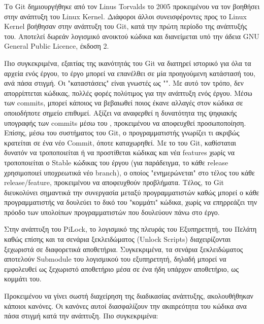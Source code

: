 		Το Git δημιουργήθηκε από τον Linus Torvalds το 2005 προκειμένου να τον βοηθήσει στην ανάπτυξη του Linux Kernel\textsuperscript{\cite{Git_History}}. Διάφοροι άλλοι συνεισφέροντες προς το Linux Kernel βοήθησαν στην ανάπτυξη του Git, κατά την πρώτη περίοδο της ανάπτυξής του. Αποτελεί δωρεάν λογισμικό ανοικτού κώδικα και διανείμεται υπό την άδεια GNU General Public Licence, έκδοση 2\textsuperscript{\cite{Git_Licence}}. 

		Πιο συγκεκριμένα, εξαιτίας της ικανότητάς του Git να διατηρεί ιστορικό για όλα τα αρχεία ενός έργου, το έργο μπορεί να επανέλθει σε μία προηγούμενη κατάστασή του, ανά πάσα στιγμή. Οι "καταστάσεις" είναι γνωστές ως "". Με αυτό τον τρόπο, δεν απορρίπτεται κώδικας, πολλές φορές πολύτιμος για την ανάπτυξη ενός έργου. Μέσω των commits, μπορεί κάποιος να βεβαιωθεί ποιος έκανε αλλαγές στον κώδικα σε οποιοδήποτε σημείο επιθυμεί. Αξίζει να αναφερθεί η δυνατότητα της ψηφιακής υπογραφής των commits μέσω του , προκειμένου να αποφευχθεί προσωποποίηση\textsuperscript{\cite{Git_commit_assurance}}. Επίσης, μέσω του συστήματος  του Git, ο προγραμματιστής γνωρίζει τι ακριβώς κρατείται σε ένα νέο Commit, όποτε καταχωρηθεί. Με το  του Git, καθίσταται δυνατόν να τροποποιείται ή να προστίθεται κώδικας και νέα features χωρίς να τροποποιείται ο Stable κώδικας του έργου (για παράδειγμα, το κάθε release χρησιμοποιεί υποχρεωτικά νέο branch), ο οποίος "ενημερώνεται" στο τέλος του κάθε release/feature, προκειμένου να αποφευχθούν προβλήματα. Τέλος, το Git διευκολύνει σημαντικά την συνεργασία μεταξύ προγραμματιστών καθώς μπορεί ο κάθε προγραμματιστής να δουλεύει το δικό του "κομμάτι" κώδικα, χωρίς να επηρρεάζει την πρόοδο των υπολοίπων προγραμματιστών που δουλεύουν πάνω στο έργο.

		Στην ανάπτυξη του PiLock, το λογισμικό της πλευράς του Εξυπηρετητή, του Πελάτη καθώς επίσης και τα σενάρια ξεκλειδώματος (Unlock Scripts) διαχειρίζονται ξεχωριστά σε διαφορετικά αποθετήρια. Συγκεκριμένα, τα σενάρια ξεκλειδώματος αποτελούν Submodule του λογισμικού του εξυπηρετητή, δηλαδή μπορεί να εμφολευθεί ως ξεχωριστό αποθετήριο μέσα σε ένα ήδη υπάρχον αποθετήριο, ως κομμάτι του.

		Προκειμένου να γίνει σωστή διαχείρηση της διαδικασίας ανάπτυξης, ακολουθήθηκαν κάποιοι κανόνες. Οι κανόνες αυτοί διασφαλίζουν την ακαιρεότητα του κώδικα ανα πάσα στιγμή κατά την ανάπτυξη. Πιο συγκεκριμένα:

